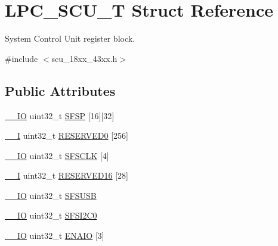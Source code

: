 \hypertarget{struct_l_p_c___s_c_u___t}{}\section{L\+P\+C\+\_\+\+S\+C\+U\+\_\+T Struct Reference}
\label{struct_l_p_c___s_c_u___t}


System Control Unit register block.  




{\ttfamily \#include $<$scu\+\_\+18xx\+\_\+43xx.\+h$>$}

\subsection*{Public Attributes}
\begin{DoxyCompactItemize}
\item 
\hyperlink{core__sc300_8h_aec43007d9998a0a0e01faede4133d6be}{\+\_\+\+\_\+\+IO} uint32\+\_\+t \hyperlink{struct_l_p_c___s_c_u___t_abc27b4f4534ed4df86473c8a5d8c953c}{S\+F\+SP} \mbox{[}16\mbox{]}\mbox{[}32\mbox{]}
\item 
\hyperlink{core__sc300_8h_af63697ed9952cc71e1225efe205f6cd3}{\+\_\+\+\_\+I} uint32\+\_\+t \hyperlink{struct_l_p_c___s_c_u___t_a53225746141a458164eff5932c82ece7}{R\+E\+S\+E\+R\+V\+E\+D0} \mbox{[}256\mbox{]}
\item 
\hyperlink{core__sc300_8h_aec43007d9998a0a0e01faede4133d6be}{\+\_\+\+\_\+\+IO} uint32\+\_\+t \hyperlink{struct_l_p_c___s_c_u___t_a7792d23643372bc1abe03e1f4514ccc8}{S\+F\+S\+C\+LK} \mbox{[}4\mbox{]}
\item 
\hyperlink{core__sc300_8h_af63697ed9952cc71e1225efe205f6cd3}{\+\_\+\+\_\+I} uint32\+\_\+t \hyperlink{struct_l_p_c___s_c_u___t_adddf710751788c0d26565d1a9036f524}{R\+E\+S\+E\+R\+V\+E\+D16} \mbox{[}28\mbox{]}
\item 
\hyperlink{core__sc300_8h_aec43007d9998a0a0e01faede4133d6be}{\+\_\+\+\_\+\+IO} uint32\+\_\+t \hyperlink{struct_l_p_c___s_c_u___t_a7f46caa9ce7787b67dcd9163623091fc}{S\+F\+S\+U\+SB}
\item 
\hyperlink{core__sc300_8h_aec43007d9998a0a0e01faede4133d6be}{\+\_\+\+\_\+\+IO} uint32\+\_\+t \hyperlink{struct_l_p_c___s_c_u___t_a3c16464bcad1a2d724d5b33eacdb6271}{S\+F\+S\+I2\+C0}
\item 
\hyperlink{core__sc300_8h_aec43007d9998a0a0e01faede4133d6be}{\+\_\+\+\_\+\+IO} uint32\+\_\+t \hyperlink{struct_l_p_c___s_c_u___t_a762d35c73a96d6bde03ee84571facab5}{E\+N\+A\+IO} \mbox{[}3\mbox{]}
\item 

\end{DoxyCompactItemize}
